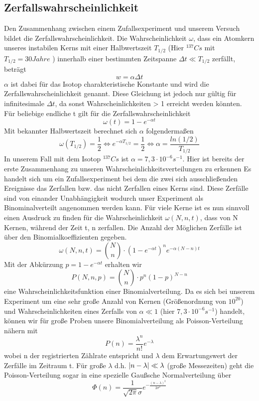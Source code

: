 \documentclass{article}
\begin{document}
            \subsection{Zerfallswahrscheinlichkeit}
                Den Zusammenhang zwischen einem Zufallsexperiment und unserem Versuch bildet die Zerfallswahrscheinlichkeit.
                Die Wahrscheinlichkeit $\omega$, dass ein Atomkern unseres instabilen Kerns mit einer Halbwertszeit $ T_{1/2} $ (Hier $^{137}Cs$ mit $ T_{1/2}=30 Jahre $ )
                innerhalb einer bestimmten Zeitspanne $\Delta t \ll T_{1/2}$ zerfällt, beträgt
                $$w = \alpha \Delta t$$
                $\alpha$ ist dabei für das Isotop charakteristische Konstante und wird die Zerfallswahrscheinlichkeit genannt.
                Diese Gleichung ist jedoch nur gültig für infinitesimale $\Delta t$, da sonst Wahrscheinlichkeiten > 1 erreicht werden könnten.
                Für beliebige endliche t gilt für die Zerfallswahrscheinlichkeit
                $$\omega(t)=1-e^{-\alpha t}$$
                Mit bekannter Halbwertszeit berechnet sich $\alpha$ folgendermaßen
                $$ \omega(T_{1/2}) = \frac{1}{2} \Leftrightarrow e^{-\alpha T_{1/2}} = \frac{1}{2} \Leftrightarrow \alpha = \frac{ln(1/2)}{T_{1/2}}$$
                In unserem Fall mit dem Isotop $^137Cs$ ist $\alpha = 7,3 \cdot 10^{-6} s^{-1}$.
                Hier ist bereits der erste Zusammenhang zu unseren Wahrscheinlichkeitsverteilungen zu erkennen Es handelt sich um ein
                Zufallsexperiment bei dem die zwei sich ausschließenden Ereignisse das Zerfallen bzw. das nicht Zerfallen eines Kerns sind.
                Diese Zerfälle sind von einander Unabhängigkeit wodurch unser Experiment als Binominalverteilt angenommen werden kann.
                Für viele Kerne ist es nun sinnvoll einen Ausdruck zu finden für die Wahrscheinlichkeit $\omega(N,n,t)$, dass von N
                Kernen, während der Zeit t, n zerfallen. Die Anzahl der Möglichen  Zerfälle ist über den Binomialkoeffizienten gegeben.
                $$ \omega(N,n,t) = {N\choose n}\cdot(1-e^{-\alpha t})^n e^{-\alpha(N-n)t}$$
                Mit der Abkürzung $p = 1 - e^{-\alpha t}$
                erhalten wir
                $$P(N,n,p) = {N\choose n}\cdot p^n (1-p)^{N-n}$$
                eine Wahrscheinlichkeitsfunktion einer Binomialverteilung.
                Da es sich bei unserem Experiment um eine sehr große Anzahl von Kernen (Größenordnung von $10^{20}$) 
                und Wahrscheinlichkeiten eines Zerfalls von $\alpha \ll 1$ (hier $7,3 \cdot 10^{-6} s^{-1}$) handelt, können wir für
                große Proben unsere Binomialverteilung als Poisson-Verteilung nähern mit
                $$P(n) = \frac{\lambda^n}{n!} e^{-\lambda}$$
                wobei n der registrierten Zählrate entspricht und $\lambda$ dem Erwartungswert der Zerfälle im Zeitraum t.
                Für große $\lambda$ d.h. $\arrowvert n - \lambda \arrowvert \ll \lambda$ (große Messezeiten) geht die Poisson-Verteilung
                sogar in eine spezielle Gaußsche Normalverteilung über
                $$\Phi(n) = \frac{1}{\sqrt{2\pi}\sigma} e^{-\frac{(n-\lambda)^2}{2\sigma^2}}$$
\end{document}
